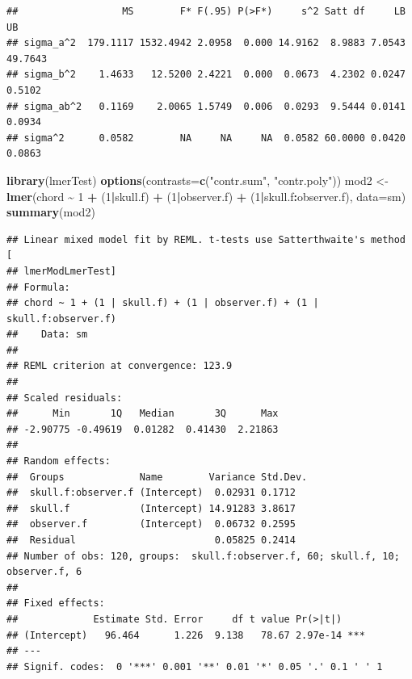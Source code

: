 \documentclass[
]{book}
\newenvironment{Shaded}{\begin{snugshade}}{\end{snugshade}}
\newcommand{\AttributeTok}[1]{\textcolor[rgb]{0.13,0.29,0.53}{#1}}
\newcommand{\DecValTok}[1]{\textcolor[rgb]{0.00,0.00,0.81}{#1}}
\newcommand{\FunctionTok}[1]{\textcolor[rgb]{0.13,0.29,0.53}{\textbf{#1}}}
\newcommand{\NormalTok}[1]{#1}
\newcommand{\OtherTok}[1]{\textcolor[rgb]{0.56,0.35,0.01}{#1}}
\newcommand{\SpecialCharTok}[1]{\textcolor[rgb]{0.81,0.36,0.00}{\textbf{#1}}}
\newcommand{\StringTok}[1]{\textcolor[rgb]{0.31,0.60,0.02}{#1}}
\begin{document}
\begin{verbatim}
##                  MS        F* F(.95) P(>F*)     s^2 Satt df     LB      UB
## sigma_a^2  179.1117 1532.4942 2.0958  0.000 14.9162  8.9883 7.0543 49.7643
## sigma_b^2    1.4633   12.5200 2.4221  0.000  0.0673  4.2302 0.0247  0.5102
## sigma_ab^2   0.1169    2.0065 1.5749  0.006  0.0293  9.5444 0.0141  0.0934
## sigma^2      0.0582        NA     NA     NA  0.0582 60.0000 0.0420  0.0863
\end{verbatim}

\begin{Shaded}
\begin{Highlighting}[]
\FunctionTok{library}\NormalTok{(lmerTest)}
\FunctionTok{options}\NormalTok{(}\AttributeTok{contrasts=}\FunctionTok{c}\NormalTok{(}\StringTok{"contr.sum"}\NormalTok{, }\StringTok{"contr.poly"}\NormalTok{))}
\NormalTok{mod2 }\OtherTok{\textless{}{-}} \FunctionTok{lmer}\NormalTok{(chord }\SpecialCharTok{\textasciitilde{}} \DecValTok{1} \SpecialCharTok{+}\NormalTok{  (}\DecValTok{1}\SpecialCharTok{|}\NormalTok{skull.f) }\SpecialCharTok{+}\NormalTok{ (}\DecValTok{1}\SpecialCharTok{|}\NormalTok{observer.f) }\SpecialCharTok{+}\NormalTok{ (}\DecValTok{1}\SpecialCharTok{|}\NormalTok{skull.f}\SpecialCharTok{:}\NormalTok{observer.f), }\AttributeTok{data=}\NormalTok{sm)}
\FunctionTok{summary}\NormalTok{(mod2)}
\end{Highlighting}
\end{Shaded}

\begin{verbatim}
## Linear mixed model fit by REML. t-tests use Satterthwaite's method [
## lmerModLmerTest]
## Formula: 
## chord ~ 1 + (1 | skull.f) + (1 | observer.f) + (1 | skull.f:observer.f)
##    Data: sm
## 
## REML criterion at convergence: 123.9
## 
## Scaled residuals: 
##      Min       1Q   Median       3Q      Max 
## -2.90775 -0.49619  0.01282  0.41430  2.21863 
## 
## Random effects:
##  Groups             Name        Variance Std.Dev.
##  skull.f:observer.f (Intercept)  0.02931 0.1712  
##  skull.f            (Intercept) 14.91283 3.8617  
##  observer.f         (Intercept)  0.06732 0.2595  
##  Residual                        0.05825 0.2414  
## Number of obs: 120, groups:  skull.f:observer.f, 60; skull.f, 10; observer.f, 6
## 
## Fixed effects:
##             Estimate Std. Error     df t value Pr(>|t|)    
## (Intercept)   96.464      1.226  9.138   78.67 2.97e-14 ***
## ---
## Signif. codes:  0 '***' 0.001 '**' 0.01 '*' 0.05 '.' 0.1 ' ' 1
\end{verbatim}
\end{document}
